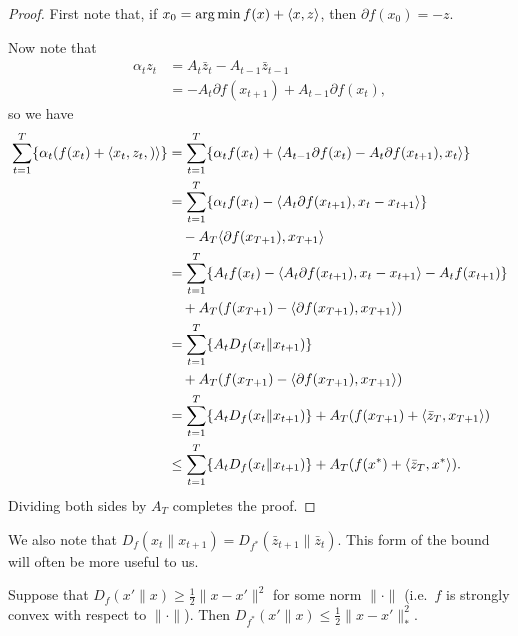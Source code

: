 \documentclass[paper.tex]{subfiles}
\begin{document}
\begin{proof}
First note that, if $x_0 = \arg\min f(x) + \left\langle x, z \right\rangle$, 
then $\partial f(x_0) = -z$.


Now note that
\begin{align}
\alpha_{t}z_{t} 
&= A_{t}\bar z_{t} - A_{t-1}\bar z_{t-1} \\
&= - A_{t}\partial f(x_{t+1}) + A_{t-1} \partial f(x_{t}),
\end{align}
so we have
\begin{align*}
\sum_{t=1}^T \{\alpha_t(f(x_t) + \left\langle x_{t}, z_{t}, ) \right\rangle\}
 &= \sum_{t=1}^T \{\alpha_t f(x_t) + \langle A_{t-1} \partial f(x_t) - A_t \partial f(x_{t+1}), x_t \rangle\} \\
 &= \sum_{t=1}^T \{\alpha_t f(x_t) - \langle A_{t} \partial f(x_{t+1}), x_t-x_{t+1} \rangle\} \\
 & \quad - A_{T}\langle \partial f(x_{T+1}), x_{T+1} \rangle \\
 &= \sum_{t=1}^T \{A_t f(x_t) - \langle A_{t} \partial f(x_{t+1}), x_t-x_{t+1} \rangle - A_t f(x_{t+1})\}  \\
 &\quad+ A_T(f(x_{T+1}) - \langle \partial f(x_{T+1}), x_{T+1} \rangle) \nonumber \\
 &= \sum_{t=1}^T \{A_tD_f(x_t \| x_{t+1})\}  \\
 &\quad+ A_T(f(x_{T+1}) - \langle \partial f(x_{T+1}), x_{T+1} \rangle) \nonumber \\
 &= \sum_{t=1}^T \{A_tD_f(x_t \| x_{t+1})\} + A_T(f(x_{T+1}) + \langle \bar{z}_T, x_{T+1} \rangle) \\
 &\leq \sum_{t=1}^T \{A_tD_f(x_t \| x_{t+1})\} + A_T(f(x^*) + \langle \bar{z}_T, x^* \rangle). 
\end{align*}
Dividing both sides by $A_T$ completes the proof.
\end{proof}

We also note that $D_f(x_t \| x_{t+1}) = D_{f^*}(\bar{z}_{t+1} \| \bar{z}_t)$. 
This form of the bound will often be more useful to us.
\begin{lemma}
\label{lem:convexity}
Suppose that $D_f(x' \| x) \geq \frac{1}{2}\|x-x'\|^2$ for some 
norm $\|\cdot\|$ (i.e.\ $f$ is strongly 
convex with respect to $\|\cdot\|$).
Then $D_{f^*}(x' \| x) \leq \frac{1}{2}\|x-x'\|_{*}^2$.
\end{lemma}
\end{document}
